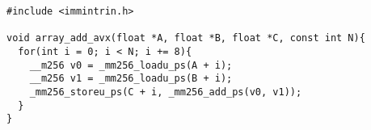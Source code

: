 \begin{lstlisting}[frame=single]
#include <immintrin.h>

void array_add_avx(float *A, float *B, float *C, const int N){
  for(int i = 0; i < N; i += 8){
    __m256 v0 = _mm256_loadu_ps(A + i);
    __m256 v1 = _mm256_loadu_ps(B + i);
    _mm256_storeu_ps(C + i, _mm256_add_ps(v0, v1));
  }
}
\end{lstlisting}

